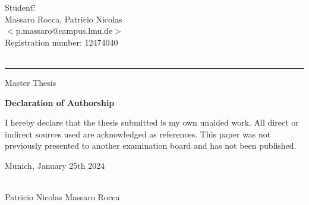 \documentclass[11pt]{article}
\numberwithin{figure}{section}
\numberwithin{table}{section}
\newcommand{\declarationhead}{Declaration of Authorship}
\newcommand{\declaration}{I hereby declare that the thesis submitted is my own unaided work. All direct or indirect
sources used are acknowledged as references. \newline
This paper was not previously presented to another examination board and has not
been published.

\vspace{1cm}
Munich, January 25th 2024

\vspace{1.5cm}
\makebox[9.8cm]{\dotfill}\\
Patricio Nicolas Massaro Rocca
}
\newcommand{\erklaerung}{
  \begin{titlepage}
    \vspace*{\fill}
    \parindent 0cm
    \begin{center}
      \textbf{\declarationhead}

      \vspace{1cm}
  
      \begin{minipage}{9.8cm}
			\declaration
				
        

      \end{minipage}
  
    \end{center}
  
    \vspace*{\fill}
  \end{titlepage}
}
\begin{document}
\begin{titlepage}

\begin{tabbing}
	Student:\hspace{-1cm}\=\+\hspace{1cm}\=\hspace{6cm}\=\\
		Massaro Rocca, Patricio Nicolas	\>\> \\
			\>\footnotesize{$<$p.massaro@campus.lmu.de$>$}\\
            \>\footnotesize{Registration number: 12474040}\\
		\\
\end{tabbing}

\vfill

\hrule
\vspace{0.2cm}
\noindent\small{Master Thesis\hfill }
\end{titlepage}

\erklaerung



 \thispagestyle{empty}
\tableofcontents
 \thispagestyle{empty}
\newpage

%
%
\setcounter{page}{1}











\newpage

\pagestyle{empty}


\end{document}
